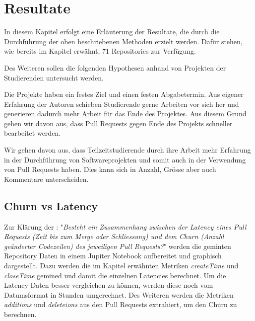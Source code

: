


\chapter{Resultate} %

\label{Chapter4} %

In diesem Kapitel erfolgt eine Erläuterung der Resultate, die durch die Durchführung der oben beschriebenen Methoden erzielt werden. Dafür stehen, wie bereits im Kapitel  erwähnt, 71 Repositories zur Verfügung. 

Des Weiteren sollen die folgenden Hypothesen anhand von Projekten der Studierenden untersucht werden.


Die Projekte haben ein festes Ziel und einen festen Abgabetermin. Aus eigener Erfahrung der Autoren schieben Studierende gerne Arbeiten vor sich her und generieren dadurch mehr Arbeit für das Ende des Projektes. Aus diesem Grund gehen wir davon aus, dass Pull Requests gegen Ende des Projekts schneller bearbeitet werden.



Wir gehen davon aus, dass Teilzeitstudierende durch ihre Arbeit mehr Erfahrung in der Durchführung von Softwareprojekten und somit auch in der Verwendung von Pull Requests haben. Dies kann sich in Anzahl, Grösse aber auch Kommentare unterscheiden. 


\section{Churn vs Latency}
Zur Klärung der : "\textit{Besteht ein Zusammenhang zwischen der Latency eines Pull
Requests (Zeit bis zum Merge oder Schliessung) und dem Churn (Anzahl geänderter Codezeilen) des jeweiligen Pull Requests?}" werden die geminten Repository Daten in einem Jupiter Notebook aufbereitet und graphisch dargestellt. Dazu werden die im Kapitel  erwähnten Metriken \textit{createTime} und \textit{closeTime} gemined und damit die einzelnen Latencies berechnet. Um die Latency-Daten besser vergleichen zu können, werden diese noch vom Datumsformat in Stunden umgerechnet. Des Weiteren werden die Metriken  \textit{additions} und  \textit{deleteions} aus den Pull Requests extrahiert, um den Churn zu berechnen.

